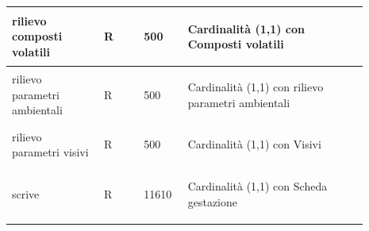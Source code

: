 \documentclass[12pt,a4paper]{article}
\begin{document}
\begin{center}
\begin{longtable}{|p{0.23\linewidth}|p{0.1\linewidth}|p{0.11\linewidth}|p{0.45\linewidth}|}
\hline
rilievo composti volatili 				& \begin{center}
\vspace{-25pt}R
\end{center}
					& \begin{center}
					\vspace{-25pt}500\end{center}
					& \begin{flushleft}\vspace{-25pt} Cardinalità (1,1) con Composti volatili \end{flushleft}\\ 

\hline
rilievo parametri ambientali 				& \begin{center}
\vspace{-25pt}R
\end{center}
					& \begin{center}
					\vspace{-25pt}500\end{center}
					& \begin{flushleft}\vspace{-25pt} Cardinalità (1,1) con rilievo parametri ambientali \end{flushleft}\\ 

\hline
rilievo parametri visivi 				& \begin{center}
\vspace{-25pt}R
\end{center}
					& \begin{center}
					\vspace{-25pt}500\end{center}
					& \begin{flushleft}\vspace{-25pt} Cardinalità (1,1) con Visivi \end{flushleft}\\ 

\hline
scrive 				& \begin{center}
\vspace{-25pt}R
\end{center}
					& \begin{center}
					\vspace{-25pt}11610\end{center}
					& \begin{flushleft}\vspace{-25pt} Cardinalità (1,1) con Scheda gestazione \end{flushleft}\\ 


\end{longtable}
\end{center}
\end{document}
